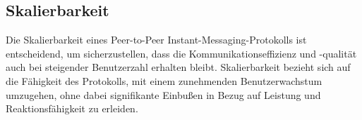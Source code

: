 \subsection{Skalierbarkeit}

Die Skalierbarkeit eines Peer-to-Peer Instant-Messaging-Protokolls ist entscheidend, um sicherzustellen, dass die Kommunikationseffizienz und -qualität auch bei steigender Benutzerzahl erhalten bleibt. Skalierbarkeit bezieht sich auf die Fähigkeit des Protokolls, mit einem zunehmenden Benutzerwachstum umzugehen, ohne dabei signifikante Einbußen in Bezug auf Leistung und Reaktionsfähigkeit zu erleiden.
